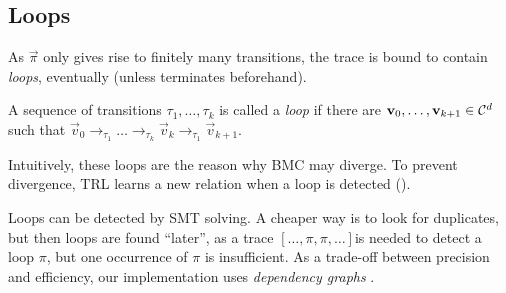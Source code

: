 \subsection{Loops}
\label{sec:loops}

As $\vec{\pi}$ only gives rise to finitely many transitions, the trace is bound to contain \emph{loops}, eventually (unless  terminates beforehand).
%
\begin{definition}[Loop]
  A sequence of transitions $\tau_1,\ldots,\tau_k$ is called a \emph{loop} if there are $\bm{\mathrm{v}}_0,\ldots,\bm{\mathrm{v}}_{k+1} \in \mathcal{C}^d$ such that $\vec{v}_0 \to_{\tau_1} \ldots \to_{\tau_k} \vec{v}_{k} \to_{\tau_1} \vec{v}_{k + 1}$.
\end{definition}
%
Intuitively, these loops are the reason why BMC may diverge.
%
To prevent divergence, TRL learns a new relation when a loop is detected ().
%
\begin{remark}
  Loops can be detected by SMT solving.
%
A cheaper way is to look for duplicates, but then loops are found ``later'', as
%
a trace $[\ldots, \pi, \pi, \ldots]$\linebreak is needed to detect a loop $\pi$, but one occurrence of $\pi$ is insufficient.
%
As a trade-off between precision and efficiency, our im\-ple\-men\-ta\-tion uses \emph{dependency graphs} \cite{abmc}.
\end{remark}

